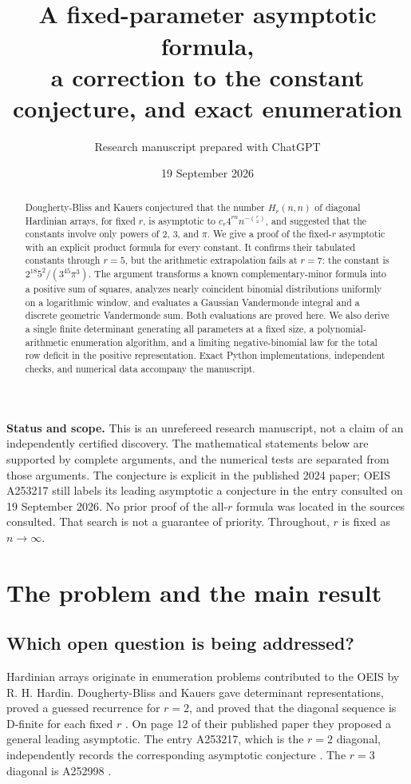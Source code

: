 \documentclass[11pt]{article}
\title{\vspace{-1.5em}{\color{ink}\bfseries Diagonal Hardinian Arrays}\\[0.4em]
\large A fixed-parameter asymptotic formula,\\
a correction to the constant conjecture, and exact enumeration}
\author{Research manuscript prepared with ChatGPT}
\date{19 September 2026}
\numberwithin{equation}{section}
\theoremstyle{definition}
\begin{document}
\maketitle
\begin{abstract}
Dougherty-Bliss and Kauers conjectured that the number $H_r(n,n)$ of diagonal Hardinian arrays, for fixed $r$, is asymptotic to $c_r 4^{rn}n^{-\binom r2}$, and suggested that the constants involve only powers of $2$, $3$, and $\pi$. We give a proof of the fixed-$r$ asymptotic with an explicit product formula for every constant. It confirms their tabulated constants through $r=5$, but the arithmetic extrapolation fails at $r=7$: the constant is $2^{18}5^2/(3^{45}\pi^3)$. The argument transforms a known complementary-minor formula into a positive sum of squares, analyzes nearly coincident binomial distributions uniformly on a logarithmic window, and evaluates a Gaussian Vandermonde integral and a discrete geometric Vandermonde sum. Both evaluations are proved here. We also derive a single finite determinant generating all parameters at a fixed size, a polynomial-arithmetic enumeration algorithm, and a limiting negative-binomial law for the total row deficit in the positive representation. Exact Python implementations, independent checks, and numerical data accompany the manuscript.
\end{abstract}

\begin{resultbox}
\textbf{Status and scope.} This is an unrefereed research manuscript, not a claim of an independently certified discovery. The mathematical statements below are supported by complete arguments, and the numerical tests are separated from those arguments. The conjecture is explicit in the published 2024 paper; OEIS A253217 still labels its leading asymptotic a conjecture in the entry consulted on 19 September 2026. No prior proof of the all-$r$ formula was located in the sources consulted. That search is not a guarantee of priority. Throughout, $r$ is fixed as $n\to\infty$.
\end{resultbox}

\newpage
{\setlength{\parskip}{0pt}\tableofcontents}
\newpage

\section{The problem and the main result}\label{sec:main}

\subsection{Which open question is being addressed?}
Hardinian arrays originate in enumeration problems contributed to the OEIS by R. H. Hardin. Dougherty-Bliss and Kauers gave determinant representations, proved a guessed recurrence for $r=2$, and proved that the diagonal sequence is D-finite for each fixed $r$ \cite{DK}. On page 12 of their published paper they proposed a general leading asymptotic. The entry A253217, which is the $r=2$ diagonal, independently records the corresponding asymptotic conjecture \cite{OEIS2}. The $r=3$ diagonal is A252998 \cite{OEIS3}.
\end{document}
